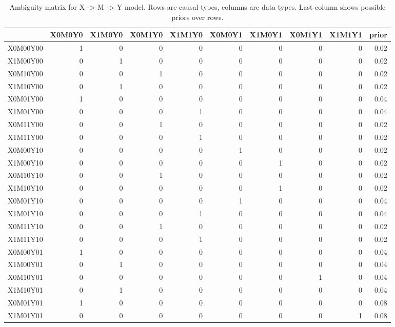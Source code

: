 \documentclass[12pt,]{book}
\begin{document}
\begin{table}[t]

\caption{\label{tab:unnamed-chunk-28}Ambiguity matrix for X -> M -> Y model. Rows are causal types, columns are data types. Last column shows possible priors over rows.}
\centering
\begin{tabular}{l|r|r|r|r|r|r|r|r|r}
\hline
  & X0M0Y0 & X1M0Y0 & X0M1Y0 & X1M1Y0 & X0M0Y1 & X1M0Y1 & X0M1Y1 & X1M1Y1 & prior\\
\hline
X0M00Y00 & 1 & 0 & 0 & 0 & 0 & 0 & 0 & 0 & 0.02\\
\hline
X1M00Y00 & 0 & 1 & 0 & 0 & 0 & 0 & 0 & 0 & 0.02\\
\hline
X0M10Y00 & 0 & 0 & 1 & 0 & 0 & 0 & 0 & 0 & 0.02\\
\hline
X1M10Y00 & 0 & 1 & 0 & 0 & 0 & 0 & 0 & 0 & 0.02\\
\hline
X0M01Y00 & 1 & 0 & 0 & 0 & 0 & 0 & 0 & 0 & 0.04\\
\hline
X1M01Y00 & 0 & 0 & 0 & 1 & 0 & 0 & 0 & 0 & 0.04\\
\hline
X0M11Y00 & 0 & 0 & 1 & 0 & 0 & 0 & 0 & 0 & 0.02\\
\hline
X1M11Y00 & 0 & 0 & 0 & 1 & 0 & 0 & 0 & 0 & 0.02\\
\hline
X0M00Y10 & 0 & 0 & 0 & 0 & 1 & 0 & 0 & 0 & 0.02\\
\hline
X1M00Y10 & 0 & 0 & 0 & 0 & 0 & 1 & 0 & 0 & 0.02\\
\hline
X0M10Y10 & 0 & 0 & 1 & 0 & 0 & 0 & 0 & 0 & 0.02\\
\hline
X1M10Y10 & 0 & 0 & 0 & 0 & 0 & 1 & 0 & 0 & 0.02\\
\hline
X0M01Y10 & 0 & 0 & 0 & 0 & 1 & 0 & 0 & 0 & 0.04\\
\hline
X1M01Y10 & 0 & 0 & 0 & 1 & 0 & 0 & 0 & 0 & 0.04\\
\hline
X0M11Y10 & 0 & 0 & 1 & 0 & 0 & 0 & 0 & 0 & 0.02\\
\hline
X1M11Y10 & 0 & 0 & 0 & 1 & 0 & 0 & 0 & 0 & 0.02\\
\hline
X0M00Y01 & 1 & 0 & 0 & 0 & 0 & 0 & 0 & 0 & 0.04\\
\hline
X1M00Y01 & 0 & 1 & 0 & 0 & 0 & 0 & 0 & 0 & 0.04\\
\hline
X0M10Y01 & 0 & 0 & 0 & 0 & 0 & 0 & 1 & 0 & 0.04\\
\hline
X1M10Y01 & 0 & 1 & 0 & 0 & 0 & 0 & 0 & 0 & 0.04\\
\hline
X0M01Y01 & 1 & 0 & 0 & 0 & 0 & 0 & 0 & 0 & 0.08\\
\hline
X1M01Y01 & 0 & 0 & 0 & 0 & 0 & 0 & 0 & 1 & 0.08\\

\end{tabular}
\end{table}
\end{document}
